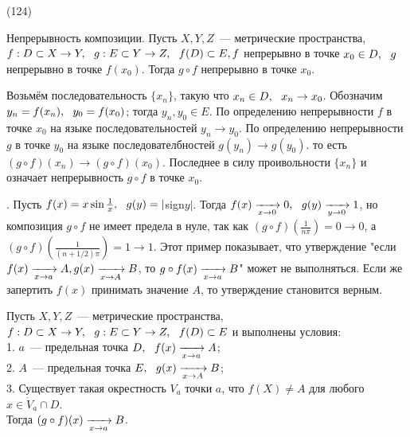 (124)

\T \q Непрерывность композиции. Пусть $X, Y, Z$~--- метрические пространства, $f : D \subset X \to Y,\ \  g: E \subset Y \to Z,\ \  f(D) \subset E, f$ непрерывно в точке $x_0 \in D,\ \  g$ непрерывно в точке $f(x_0)$. Тогда $g\circ f$ непрерывно в точке $x_0$.

\D Возьмём последовательность $\{x_n\}$, такую что $x_n \in D,\ \  x_n \to x_0$. Обозначим $y_n = f(x_n),\ \  y_0 = f(x_0)$; тогда $y_n, y_0 \in E$. По определению непрерывности $f$ в точке $x_0$ на языке последовательностей $y_n \to y_0$. По определению непрерывности $g$ в точке $y_0$ на языке последователбностей $g(y_n) \to g(y_0)$. то есть  $(g \circ f)(x_n) \to (g \circ f)(x_0)$. Последнее в силу проивольности $\{x_n\}$ и означает непрерывность $g \circ f$ в точке $x_0$.

. Пусть $f(x) = x \sin\frac 1x,\ \  g (y) = |$sign$y|$. Тогда $f(x) \xrightarrow[x \to 0]{} 0,\ \  g(y) \xrightarrow[y \to 0]{} 1$, но композиция $g \circ f$ не имеет предела в нуле, так как $(g \circ f) (\frac 1{n\pi}) = 0 \to 0$, а $(g\circ f)(\frac 1{(n + 1/2)\pi}) = 1 \to 1$. Этот пример показывает, что утверждение "если $f(x) \xrightarrow[x\to a]{} A, g(x) \xrightarrow[x \to A]{} B$, то $g \circ f(x) \xrightarrow[x\to a]{} B$" может не выполняться. Если же запертить $f(x)$ принимать значение $A$, то утверждение становится верным.

Пусть $X, Y, Z$~--- метрические пространства, $f: D \subset X \to Y,\ \  g: E \subset Y \to Z,\ \  f(D) \subset E$ и выполнены условия:\\
1. $a$~--- предельная точка $D,\ \  f(x) \xrightarrow[x\to a]{} A$;\\
2. $A$~--- предельная точка $E,\ \  g(x) \xrightarrow[x\to A]{} B$;\\
3. Существует такая окрестность $V_a$ точки $a$, что $f(X) \neq A$ для любого $x \in \dot{V}_a \cap D$.\\
Тогда $(g \circ f) (x) \xrightarrow[x\to a]{} B$.